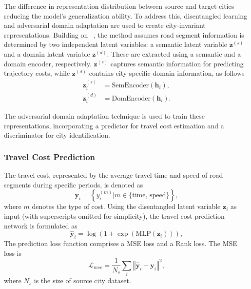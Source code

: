 The difference in representation distribution between source and target cities reducing the model’s generalization ability. To address this, disentangled learning and adversarial domain adaptation are used to create city-invariant representations. Building on ~\cite{disent_ijcai}, the method assumes road segment information is determined by two independent latent variables: a semantic latent variable $\bm{z}^{(s)}$ and a domain latent variable $\bm{z}^{(d)}$. These are extracted using a semantic and a domain encoder, respectively. $\bm{z}^{(s)}$ captures semantic information for predicting trajectory costs, while $\bm{z}^{(d)}$ contains city-specific domain information, as follows
\begin{equation}
    \label{equ:dis_encoder}
    \begin{split}
    \bm{z}_i^{(s)} &= \text{SemEncoder} \left( \bm{h}_i \right), \\
    \bm{z}_i^{(d)} &= \text{DomEncoder} \left( \bm{h}_i \right).
    \end{split}
\end{equation}

The adversarial domain adaptation technique is used to train these representations, incorporating a predictor for travel cost estimation and a discriminator for city identification.


\subsubsection{Travel Cost Prediction}

The travel cost, represented by the average travel time and speed of road segments during specific periods, is denoted as
\begin{equation}
    \bm{y}_i = \left\{ y_i^{(m)} \Big| m \in \{\text{time, speed}\} \right\},
\end{equation}
 where $m$ denotes the type of cost. Using the disentangled latent variable $\bm{z}_i$ as input (with superscripts omitted for simplicity), the travel cost prediction network is formulated as
\begin{equation}
\hat{\bm{y}}_i = \log \left( 1 + \exp \left( \text{MLP} \left(\bm{z}_i \right) \right) \right),
\end{equation}
The prediction loss function comprises a MSE loss and a Rank loss. The MSE loss is 
\begin{equation}
    \mathcal{L}_{mse} = \frac{1}{N_s} \sum_{i} \left \Vert \hat{\bm{y}}_i - \bm{y}_i \right \Vert ^2,
\end{equation}
where $N_s$ is the size of source city dataset.

